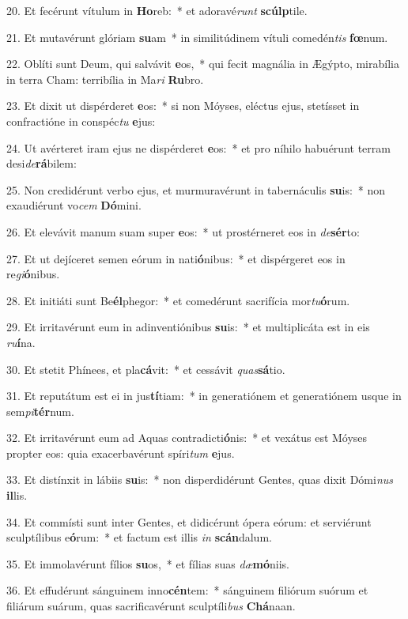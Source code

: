 20. Et fecérunt vítulum in \textbf{Ho}reb:~*  et adoravé\textit{runt} \textbf{scúlp}tile.\

21. Et mutavérunt glóriam \textbf{su}am~*  in similitúdinem vítuli comedén\textit{tis} \textbf{fœ}num.\

22. Oblíti sunt Deum, qui salvávit \textbf{e}os,~*  qui fecit magnália in Ægýpto, mirabília in terra Cham: terribília in Ma\textit{ri} \textbf{Ru}bro.\

23. Et dixit ut dispérderet \textbf{e}os:~*  si non Móyses, eléctus ejus, stetísset in confractióne in conspéc\textit{tu} \textbf{e}jus:\

24. Ut avérteret iram ejus ne dispérderet \textbf{e}os:~*  et pro níhilo habuérunt terram desi\textit{de}\textbf{rá}bilem:\

25. Non credidérunt verbo ejus, et murmuravérunt in tabernáculis \textbf{su}is:~*  non exaudiérunt vo\textit{cem} \textbf{Dó}mini.\

26. Et elevávit manum suam super \textbf{e}os:~*  ut prostérneret eos in \textit{de}\textbf{sér}to:\

27. Et ut dejíceret semen eórum in nati\textbf{ó}nibus:~*  et dispérgeret eos in re\textit{gi}\textbf{ó}nibus.\

28. Et initiáti sunt Be\textbf{él}phegor:~*  et comedérunt sacrifícia mor\textit{tu}\textbf{ó}rum.\

29. Et irritavérunt eum in adinventiónibus \textbf{su}is:~*  et multiplicáta est in eis \textit{ru}\textbf{í}na.\

30. Et stetit Phínees, et pla\textbf{cá}vit:~*  et cessávit \textit{quas}\textbf{sá}tio.\

31. Et reputátum est ei in jus\textbf{tí}tiam:~*  in generatiónem et generatiónem usque in sem\textit{pi}\textbf{tér}num.\

32. Et irritavérunt eum ad Aquas contradicti\textbf{ó}nis:~*  et vexátus est Móyses propter eos: quia exacerbavérunt spíri\textit{tum} \textbf{e}jus.\

33. Et distínxit in lábiis \textbf{su}is:~*  non disperdidérunt Gentes, quas dixit Dómi\textit{nus} \textbf{il}lis.\

34. Et commísti sunt inter Gentes, et didicérunt ópera eórum: et serviérunt sculptílibus e\textbf{ó}rum:~*  et factum est illis \textit{in} \textbf{scán}dalum.\

35. Et immolavérunt fílios \textbf{su}os,~*  et fílias suas \textit{dæ}\textbf{mó}niis.\

36. Et effudérunt sánguinem inno\textbf{cén}tem:~*  sánguinem filiórum suórum et filiárum suárum, quas sacrificavérunt sculptíli\textit{bus} \textbf{Chá}naan.\

